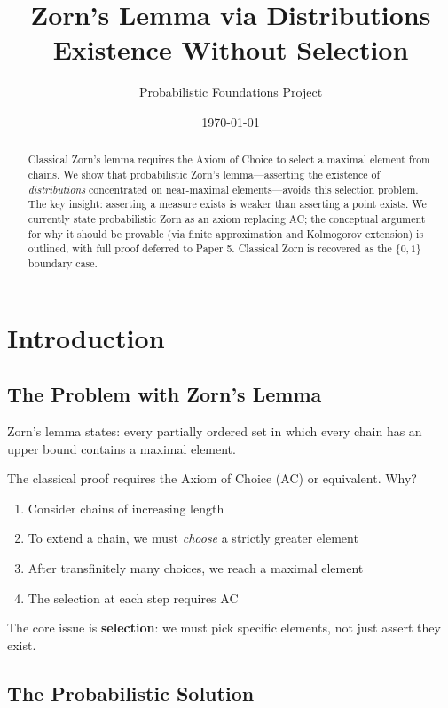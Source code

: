 \documentclass[11pt,a4paper]{article}
\title{Zorn's Lemma via Distributions\\[0.5em]
\large Existence Without Selection}
\author{Probabilistic Foundations Project}
\date{\today}
\begin{document}
\maketitle

\begin{abstract}
Classical Zorn's lemma requires the Axiom of Choice to select a maximal element from chains. We show that probabilistic Zorn's lemma---asserting the existence of \emph{distributions} concentrated on near-maximal elements---avoids this selection problem. The key insight: asserting a measure exists is weaker than asserting a point exists. We currently state probabilistic Zorn as an axiom replacing AC; the conceptual argument for why it should be provable (via finite approximation and Kolmogorov extension) is outlined, with full proof deferred to Paper 5. Classical Zorn is recovered as the $\{0,1\}$ boundary case.
\end{abstract}

\section{Introduction}

\subsection{The Problem with Zorn's Lemma}

Zorn's lemma states: every partially ordered set in which every chain has an upper bound contains a maximal element.

The classical proof requires the Axiom of Choice (AC) or equivalent. Why?

\begin{enumerate}
    \item Consider chains of increasing length
    \item To extend a chain, we must \emph{choose} a strictly greater element
    \item After transfinitely many choices, we reach a maximal element
    \item The selection at each step requires AC
\end{enumerate}

The core issue is \textbf{selection}: we must pick specific elements, not just assert they exist.

\subsection{The Probabilistic Solution}
\end{document}
